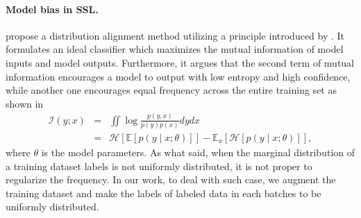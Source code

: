 \paragraph{Model bias in SSL.}
\citet{kurakin2020remixmatch} propose a distribution alignment method utilizing a principle introduced by \citet{bridle1992unsupervised}. It formulates an ideal classifier which maximizes the mutual information of model inputs and model outputs. Furthermore, it argues that the second term of mutual information encourages a model to output with low entropy and high confidence, while another one encourages equal frequency across the entire training set as shown in 
\begin{eqnarray}
\mathcal{I}(y;x) &=& \iint \log \frac{p(y,x)}{p(y)p(x)} dy dx \nonumber \\
&=& \mathcal{H}[\mathbb{E}[p(y\mid x; \theta)]] - \mathbb{E}_x[\mathcal{H}[p(y\mid x; \theta)]], \label{eq:mi}
\end{eqnarray}
where $\theta$ is the model parameters. As what \citet{kurakin2020remixmatch} said, when the marginal distribution of a training dataset labels is not uniformly distributed, it is not proper to regularize the frequency. In our work, to deal with such case, we augment the training dataset and make the labels of labeled data in each batches to be uniformly distributed.